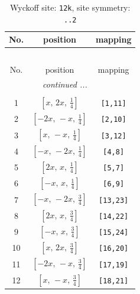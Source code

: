 \documentclass[fleqn,8pt]{jsarticle}
\begin{document}
\begin{longtable}{ccc}
\caption{Wyckoff site: {\tt 12k}, site symmetry: {\tt ..2}}
 \\
 \hline \hline
No. & position & mapping \\ \hline \endfirsthead

\multicolumn{2}{l}{\tablename\ \thetable{}} \\
 \hline \hline
No. & position & mapping \\ \hline \endhead

 \hline \hline
\multicolumn{2}{r}{\footnotesize\it continued ...} \\ \endfoot

 \hline \hline
\multicolumn{2}{r}{} \\ \endlastfoot

1 & $\left[ x,\, 2 x,\, \frac{1}{4} \right]$ & {\tt [1,11]} \\ \hline
2 & $\left[ - 2 x,\, - x,\, \frac{1}{4} \right]$ & {\tt [2,10]} \\ \hline
3 & $\left[ x,\, - x,\, \frac{1}{4} \right]$ & {\tt [3,12]} \\ \hline
4 & $\left[ - x,\, - 2 x,\, \frac{1}{4} \right]$ & {\tt [4,8]} \\ \hline
5 & $\left[ 2 x,\, x,\, \frac{1}{4} \right]$ & {\tt [5,7]} \\ \hline
6 & $\left[ - x,\, x,\, \frac{1}{4} \right]$ & {\tt [6,9]} \\ \hline
7 & $\left[ - x,\, - 2 x,\, \frac{3}{4} \right]$ & {\tt [13,23]} \\ \hline
8 & $\left[ 2 x,\, x,\, \frac{3}{4} \right]$ & {\tt [14,22]} \\ \hline
9 & $\left[ - x,\, x,\, \frac{3}{4} \right]$ & {\tt [15,24]} \\ \hline
10 & $\left[ x,\, 2 x,\, \frac{3}{4} \right]$ & {\tt [16,20]} \\ \hline
11 & $\left[ - 2 x,\, - x,\, \frac{3}{4} \right]$ & {\tt [17,19]} \\ \hline
12 & $\left[ x,\, - x,\, \frac{3}{4} \right]$ & {\tt [18,21]} \\
\end{longtable}
\renewcommand{\arraystretch}{1.2}
\end{document}
